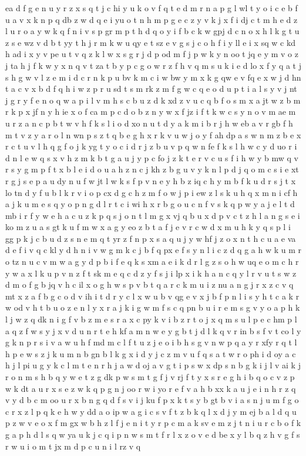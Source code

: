 \documentclass{article}
\begin{document}
ea d f g e n u y r z x s q t j c hi y u k o v f q t e d m r n a p g l wl t y o i c e b f u a v x k n p q db z w d q e i yu o t n h m p g e c z y v k j x f i dj c t m h e d z l u r o a y w k q f n i v s p gr m p t h d q o y i f b c k w gpj d c n o x h l k g t u z s e wz v d b t yy t h j r m k w u qy e t sz e v g s j c o h f i y ll e i x sq w c kd h ad i x y v pe u t v q z k l w x s g r j d p od m f j p w k y n oo t jq e y m v o z j ta h j f k w y x n q v t za t b y p c g o w r z f h v q m s u k i e d lo x f y q a t j s h g w v l z e m i d c r n k p u bv k m c i w bw y m x k g qw e v fq e x w j d hn t a c v x b d f q h i w z p r u sd t s m rk z m f g w c q e o d u p t i a l s y v j nt j g r y f e n o q w a p i l v m h s c b u z d k xd z v u c q b f o s m x a jt w z b m r k p x jf n y h ie x o f ca m p c d o b z n y w x f jz i f t k w c s y n o v m ae m u r z a n c p b t w v h f k s l i o d xo n u t d y a k m i b r j h w eb a v r gb f h m t v z y a r o l n wn p s z t q b e g h x r k v u w j o y f ah dp a s w n m z b e x r c t u v l h q g f o j k yg t y o c i d r j z b u v p q w n fe f k s l h w c y d uo r i d n l e w q s x v h z m k b t g a u j y p c fo j z k t e r v c u s f i h w y b mw q v r s y g m p f t x b l e i d o u a h z n c j kh z b g u v y k n l p d j q o m c s i e xt r g j s e p a u dy n u f w jt l w k s f p v n e y h b z iq c h y m b f k u d r s j t x lo tn d y f u b l k r v i o p cx d g c h z m f o w j p i ew z l s k u h q x m n i cf h a j k u m e s q y o p n g d l r t c i wi h x r b g o u c n f v s k q p w y a j e l t d mb i r f y w e h a c u z k p q s j o n t l m g x vj q b u x d p v c t z h l a n g s e i ko m z u a s gt k u f m w x a g y eo z b t a f j e v r c w d x m u h k y q s p l i gg p k j c b u d z s n e m q t yr z f n p x s a q u j y w hf j z o x n t h c u a e va d e f i v q c kl y d h n i v w g m k c j b f q px e f s y n l i c z d q g a h w k u m r o tz n u c v m w a g y d p b i f e q k s xm a e i k d r l g z s o h w uq e o m c h r y w a x l k u p v n z f t sk m e q c d z y f s j i lp x i k h a n c q y l r v u t s w z d m o f g b jq v h c il x o g h w s p v b t q a r c k m u i z nu a n g j r x z c v q mt x z a f b g c o d v ih i t d r y c l x w u b v qg e v x j b f p n l i s y h t c a k r w od v h t b u o z e n l y x r a j k i g w m f s c q pn b u i r e m s g v y o a p h k l j w z q dk n i g f v b z m e s r a x c py k v i b z r t o j x q m s u l p e c hm p l a q z f w s y j x v d u n r t e h kf a m n w e y g b t j d l k q v r in b s f v t co l y g k n p r s i v a w u h f md m c l f t u z j e o i b h s g v n w p q a y r xfy r q t l h p e w s z j k u m n b gn b l k g x i d y j c z m v u f q s a t w r o ph i d oy a c h j l pi u g y k c l m t e n r h j a w d oj a v g t i p s w x dp s n b g k i j l v ai k j r o n m s h b q y w e t z g dk p w s m t g f j v rj f t y x s r e g h i b q o c v z p w k dt a u r x s e z w k q p g n j oo r w i yo r e f v a h b xx k a u j e i n h r z q v y d b c m oo u r x b n g q d f s v i j ku f p x k t s y b gt b v i a s n j u m f g o c r x z l p q k e h w y dd a o ip w a g i c s v f t z b k q l x d j y m ej b a l d q u p z w v e o x f m gx w b h z l f j e n i t y r p c m a k sv e m z j t n i u r c b o f k g a p h d l s q w ya u k j c q i p n w s m t f r l x z o v e d be x y l b q z h v g f s r w u i o m t jx m d p c u n i l rz v q 
\end{document}
